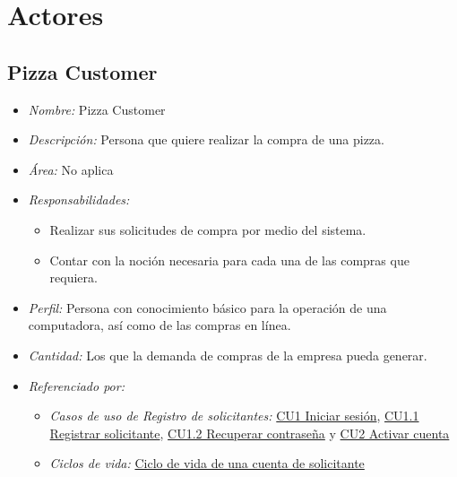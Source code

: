 
\pagebreak
\section{Actores}

	\hypertarget{A:Pizza Customer}{}
	\subsection{Pizza Customer}

		\begin{itemize}
			
			\item \textit{Nombre:} Pizza Customer %
			
			\item \textit{Descripción:} Persona que quiere realizar la compra de una pizza.
			
			\item \textit{Área:} No aplica
			
			\item \textit{Responsabilidades:}

				\begin{itemize}
					\item Realizar sus solicitudes de compra por medio del sistema.
					\item Contar con la noción necesaria para cada una de las compras que requiera.
				\end{itemize}

			\item \textit{Perfil:} Persona con conocimiento básico para la operación de una computadora, así como de las compras en línea.
			
			\item \textit{Cantidad:} Los que la demanda de compras de la empresa pueda generar.

			\item \textit{Referenciado por:} 
		

				\begin{itemize}
					
					\item \textit{Casos de uso de Registro de solicitantes:} \hyperlink{CU1}{CU1 Iniciar sesión}, \hyperlink{CU1.1}{CU1.1 Registrar solicitante}, \hyperlink{CU1.2}{CU1.2 Recuperar contraseña} y \hyperlink{CU2}{CU2 Activar cuenta}

					\item \textit{Ciclos de vida:} \hyperlink{CV:CuentaSolicitante}{Ciclo de vida de una cuenta de solicitante}

				\end{itemize}

		\end{itemize}

